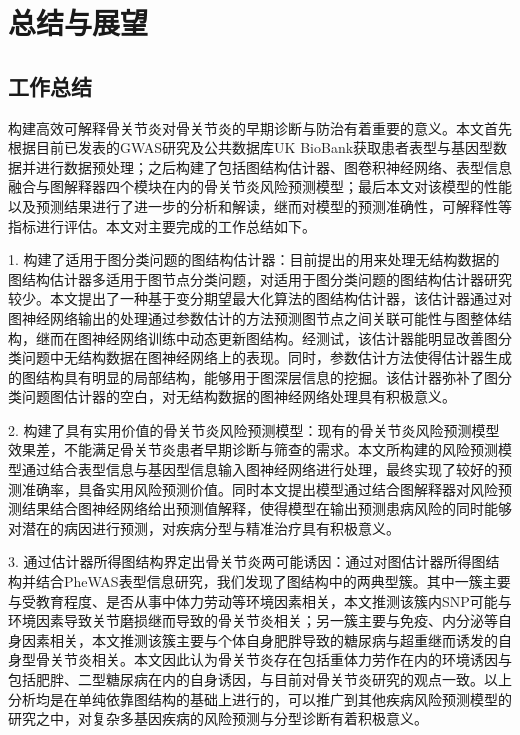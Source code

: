 \chapter{总结与展望}

\section{工作总结}

构建高效可解释骨关节炎对骨关节炎的早期诊断与防治有着重要的意义。本文首先根据目前已发表的GWAS研究及公共数据库UK BioBank获取患者表型与基因型数据并进行数据预处理；之后构建了包括图结构估计器、图卷积神经网络、表型信息融合与图解释器四个模块在内的骨关节炎风险预测模型；最后本文对该模型的性能以及预测结果进行了进一步的分析和解读，继而对模型的预测准确性，可解释性等指标进行评估。本文对主要完成的工作总结如下。

1. 构建了适用于图分类问题的图结构估计器：目前提出的用来处理无结构数据的图结构估计器多适用于图节点分类问题，对适用于图分类问题的图结构估计器研究较少。本文提出了一种基于变分期望最大化算法的图结构估计器，该估计器通过对图神经网络输出的处理通过参数估计的方法预测图节点之间关联可能性与图整体结构，继而在图神经网络训练中动态更新图结构。经测试，该估计器能明显改善图分类问题中无结构数据在图神经网络上的表现。同时，参数估计方法使得估计器生成的图结构具有明显的局部结构，能够用于图深层信息的挖掘。该估计器弥补了图分类问题图估计器的空白，对无结构数据的图神经网络处理具有积极意义。

2. 构建了具有实用价值的骨关节炎风险预测模型：现有的骨关节炎风险预测模型效果差，不能满足骨关节炎患者早期诊断与筛查的需求。本文所构建的风险预测模型通过结合表型信息与基因型信息输入图神经网络进行处理，最终实现了较好的预测准确率，具备实用风险预测价值。同时本文提出模型通过结合图解释器对风险预测结果结合图神经网络给出预测值解释，使得模型在输出预测患病风险的同时能够对潜在的病因进行预测，对疾病分型与精准治疗具有积极意义。

3. 通过估计器所得图结构界定出骨关节炎两可能诱因：通过对图估计器所得图结构并结合PheWAS表型信息研究，我们发现了图结构中的两典型簇。其中一簇主要与受教育程度、是否从事中体力劳动等环境因素相关，本文推测该簇内SNP可能与环境因素导致关节磨损继而导致的骨关节炎相关；另一簇主要与免疫、内分泌等自身因素相关，本文推测该簇主要与个体自身肥胖导致的糖尿病与超重继而诱发的自身型骨关节炎相关。本文因此认为骨关节炎存在包括重体力劳作在内的环境诱因与包括肥胖、二型糖尿病在内的自身诱因，与目前对骨关节炎研究的观点一致。以上分析均是在单纯依靠图结构的基础上进行的，可以推广到其他疾病风险预测模型的研究之中，对复杂多基因疾病的风险预测与分型诊断有着积极意义。

